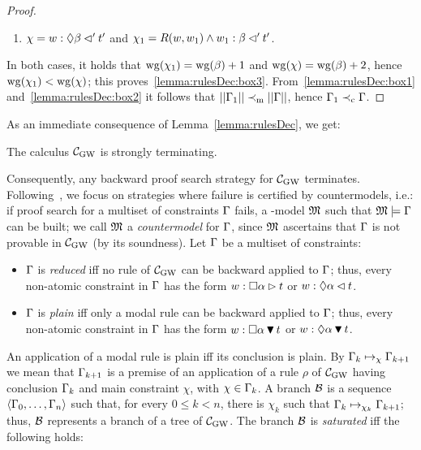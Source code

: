 \begin{proof}
\begin{enumerate}[label=(\alph*), ref=(\alph*),leftmargin=*]
\item\label{lemma:rulesDec:box3b}
  $\chi = w:\lozenge \beta \lhd' t'$ and $\chi_1 = R(w,w_1)\land w_1 : \beta \lhd' t'$.
\end{enumerate}
In both cases, it holds that $\mathrm{wg}(\chi_1)= \mathrm{wg}(\beta) +1$ and $\mathrm{wg}(\chi)=
\mathrm{wg}(\beta) +2$, hence $\mathrm{wg}(\chi_1) < \mathrm{wg}(\chi)$; this
proves~\ref{lemma:rulesDec:box3}.  From~\ref{lemma:rulesDec:box1}
and~\ref{lemma:rulesDec:box2} it follows that $||\Gamma_1||\prec_{\mathrm{m}}
||\Gamma||$, hence $\Gamma_1\prec_{\mathrm{c}} \Gamma$.
\end{proof}



As an immediate consequence of Lemma~\ref{lemma:rulesDec}, we get:

\begin{proposition}\label{prop:term}
  The calculus $\mathcal{C}_{\mathrm{GW}}$ is strongly terminating.
\end{proposition}

Consequently, any backward proof search strategy for $\mathcal{C}_{\mathrm{GW}}$
terminates.  Following~\cite{FerFioFio:2013,FioFer:2021jlc}, we focus
on strategies where failure is certified by countermodels, i.e.: if
proof search for a multiset of constraints $\Gamma$ fails, a \GWM-model
$\mathfrak{M}$ such that $\mathfrak{M}\models \Gamma$ can be built; we call $\mathfrak{M}$ a
\emph{countermodel} for $\Gamma$, since $\mathfrak{M}$ ascertains that $\Gamma$ is not
provable in $\mathcal{C}_{\mathrm{GW}}$ (by its soundness).  Let $\Gamma$ be a multiset of
constraints:

\begin{itemize}
\item $\Gamma$ is \emph{reduced} iff no rule of $\mathcal{C}_{\mathrm{GW}}$ can be backward
  applied to $\Gamma$; thus, every non-atomic constraint in $\Gamma$ has the
  form $w:\Box \alpha \rhd t$ or $w:\lozenge \alpha \lhd t$.

\item $\Gamma$ is \emph{plain} iff only a modal rule can be backward
  applied to $\Gamma$; thus, every non-atomic constraint in $\Gamma$ has the
  form $w:\Box \alpha \,\blacktriangledown\, t$ or $w:\lozenge \alpha \,\blacktriangledown\, t$.
\end{itemize}
An application of a modal rule is plain iff its conclusion is plain.
By $\Gamma_k\mapsto_{\chi} \Gamma_{k+1}$ we mean that $\Gamma_{k+1}$ is a premise
of an application of a rule $\rho$ of $\mathcal{C}_{\mathrm{GW}}$ having conclusion
$\Gamma_k$ and main constraint $\chi$, with $\chi\in\Gamma_k$.  A branch
$\mathcal{B}$ is a sequence $\langle \Gamma_0,\dots,\Gamma_n \rangle$ such that, for every $0
\leq k < n$, there is $\chi_k$ such that
$\Gamma_k\mapsto_{\chi_k} \Gamma_{k+1}$; thus, $\mathcal{B}$ represents a branch of a
tree of $\mathcal{C}_{\mathrm{GW}}$.  The branch $\mathcal{B}$ is \emph{saturated} iff the
following holds:



